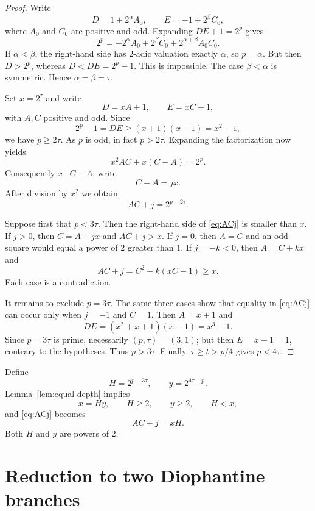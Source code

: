 \documentclass[11pt]{amsart}
\theoremstyle{remark}
\begin{document}
\begin{proof}
Write
\[
 D=1+2^\alpha A_0,
 \qquad
 E=-1+2^\beta C_0,
\]
where $A_0$ and $C_0$ are positive and odd.  Expanding $DE+1=2^p$
gives
\begin{equation}\label{eq:initial-expansion}
 2^p=-2^\alpha A_0+2^\beta C_0
      +2^{\alpha+\beta}A_0C_0.
\end{equation}
If $\alpha<\beta$, the right-hand side has $2$-adic valuation exactly
$\alpha$, so $p=\alpha$.  But then $D>2^p$, whereas $D<DE=2^p-1$.
This is impossible.  The case $\beta<\alpha$ is symmetric.  Hence
$\alpha=\beta=\tau$.

Set $x=2^\tau$ and write
\[
 D=xA+1,
 \qquad
 E=xC-1,
\]
with $A,C$ positive and odd.  Since
\[
 2^p-1=DE\ge(x+1)(x-1)=x^2-1,
\]
we have $p\ge2\tau$.  As $p$ is odd, in fact $p>2\tau$.
Expanding the factorization now yields
\[
 x^2AC+x(C-A)=2^p.
\]
Consequently $x\mid C-A$; write
\[
 C-A=jx.
\]
After division by $x^2$ we obtain
\begin{equation}\label{eq:ACj}
 AC+j=2^{p-2\tau}.
\end{equation}

Suppose first that $p<3\tau$.  Then the right-hand side of
\eqref{eq:ACj} is smaller than $x$.  If $j>0$, then $C=A+jx$ and
$AC+j>x$.  If $j=0$, then $A=C$ and an odd square would equal a
power of $2$ greater than $1$.  If $j=-k<0$, then $A=C+kx$ and
\[
 AC+j=C^2+k(xC-1)\ge x.
\]
Each case is a contradiction.

It remains to exclude $p=3\tau$.  The same three cases show that
equality in \eqref{eq:ACj} can occur only when $j=-1$ and $C=1$.
Then $A=x+1$ and
\[
 DE=(x^2+x+1)(x-1)=x^3-1.
\]
Since $p=3\tau$ is prime, necessarily $(p,\tau)=(3,1)$; but then
$E=x-1=1$, contrary to the hypotheses.  Thus $p>3\tau$.  Finally,
$\tau\ge t>p/4$ gives $p<4\tau$.
\end{proof}

Define
\begin{equation}\label{eq:Hy-def}
 H=2^{p-3\tau},
 \qquad
 y=2^{4\tau-p}.
\end{equation}
Lemma~\ref{lem:equal-depth} implies
\begin{equation}\label{eq:Hy-properties}
 x=Hy,
 \qquad H\ge2,
 \qquad y\ge2,
 \qquad H<x,
\end{equation}
and \eqref{eq:ACj} becomes
\begin{equation}\label{eq:xH}
 AC+j=xH.
\end{equation}
Both $H$ and $y$ are powers of $2$.

\section{Reduction to two Diophantine branches}
\end{document}
